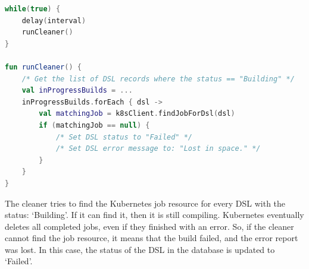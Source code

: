 \begin{lstlisting}[caption={Job cleaner loop},language=Kotlin,label=code:cleaner]
while(true) {
    delay(interval)
    runCleaner()
}

fun runCleaner() {
    /* Get the list of DSL records where the status == "Building" */
    val inProgressBuilds = ...
    inProgressBuilds.forEach { dsl ->
        val matchingJob = k8sClient.findJobForDsl(dsl)
        if (matchingJob == null) {
            /* Set DSL status to "Failed" */
            /* Set DSL error message to: "Lost in space." */
        }
    }
}
\end{lstlisting}

The cleaner tries to find the Kubernetes job resource for every DSL with the status: `Building'. If it can find it, then it is still compiling. Kubernetes eventually deletes all completed jobs, even if they finished with an error. So, if the cleaner cannot find the job resource, it means that the build failed, and the error report was lost. In this case, the status of the DSL in the database is updated to `Failed'.